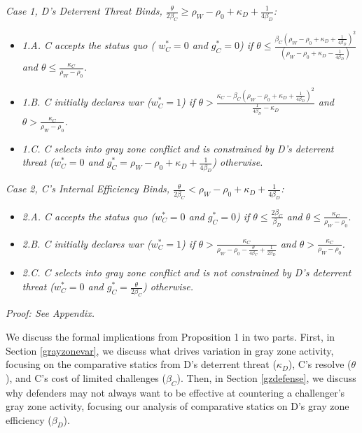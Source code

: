 \documentclass[bibtex, autowc]{apsr_submission}
\begin{document}
    \textit{Case 1, D's Deterrent Threat Binds, $\frac{\theta}{2\beta_{C}}\geq\rho_{W}-\rho_{0}+\kappa_{D}+\frac{1}{4\beta_{D}}$:} 
    \begin{itemize}
    \item \textit{1.A. C accepts the status quo ( $w_{C}^{*}=0$ and $g_{C}^{*}=0$)
    if $\theta\leq\frac{\beta_{C}\left(\rho_{W}-\rho_{0}+\kappa_{D}+\frac{1}{4\beta_{D}}\right)^{2}}{\left(\rho_{W}-\rho_{0}+\kappa_{D}-\frac{1}{4\beta_{D}}\right)}$
    and $\theta\leq\frac{\kappa_{C}}{\rho_{W}-\rho_{0}}$.} 
    \item \textit{1.B. C initially declares war ($w_{C}^{*}=1$) if $\theta>\frac{\kappa_{C}-\beta_{C}\left(\rho_{W}-\rho_{0}+\kappa_{D}+\frac{1}{4\beta_{D}}\right)^{2}}{\frac{1}{4\beta_{D}}-\kappa_{D}}$
    and $\theta>\frac{\kappa_{C}}{\rho_{W}-\rho_{0}}$.} 
    \item \textit{1.C. C selects into gray zone conflict and is constrained
    by D's deterrent threat ($w_{C}^{*}=0$ and $g_{C}^{*}=\rho_{W}-\rho_{0}+\kappa_{D}+\frac{1}{4\beta_{D}}$)
    otherwise.} 
    \end{itemize}
    \textit{Case 2, C's Internal Efficiency Binds, $\frac{\theta}{2\beta_{C}}<\rho_{W}-\rho_{0}+\kappa_{D}+\frac{1}{4\beta_{D}}$:} 
    \begin{itemize}
    \item \textit{2.A. C accepts the status quo ($w_{C}^{*}=0$ and $g_{C}^{*}=0$)
    if $\theta\leq\frac{2\beta_{C}}{\beta_{D}}$ and $\theta\leq\frac{\kappa_{C}}{\rho_{W}-\rho_{0}}$}. 
    \item \textit{2.B. C initially declares war ($w_{C}^{*}=1$) if $\theta>\frac{\kappa_{C}}{\rho_{W}-\rho_{0}-\frac{\theta}{4\beta_{C}}+\frac{1}{2\beta_{D}}}$
    and $\theta>\frac{\kappa_{C}}{\rho_{W}-\rho_{0}}$.} 
    \item \textit{2.C. C selects into gray zone conflict and is not constrained
    by D's deterrent threat ($w_{C}^{*}=0$ and $g_{C}^{*}=\frac{\theta}{2\beta_{C}}$)
    otherwise.} 
    \end{itemize}
    \textit{Proof: See Appendix.}
    
    We discuss the formal implications from Proposition 1 in two parts. First, in Section \ref{grayzonevar}, we discuss what drives variation in gray zone activity, focusing on the comparative statics from D's deterrent threat ($\kappa_D$), C's resolve ($\theta$), and C's cost of limited challenges ($\beta_C$). Then, in Section \ref{gzdefense}, we discuss why defenders may not always want to be effective at countering a challenger's gray zone activity, focusing our analysis of comparative statics on D's gray zone efficiency ($\beta_D$).
\end{document}
